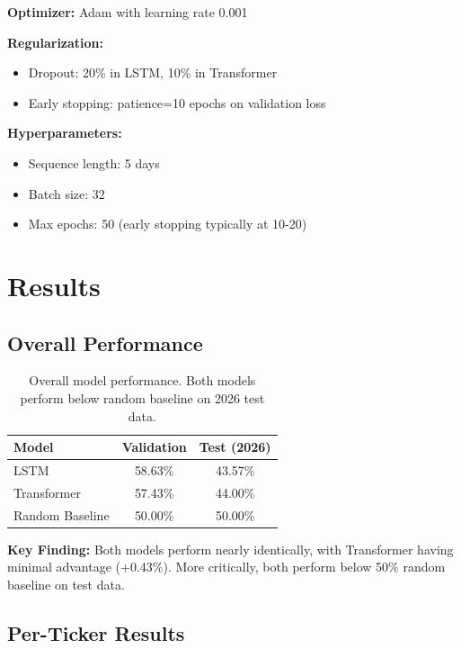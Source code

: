 \documentclass[10pt,twocolumn]{article}
\begin{document}
\textbf{Optimizer:} Adam with learning rate 0.001

\textbf{Regularization:}
\begin{itemize}
\item Dropout: 20\% in LSTM, 10\% in Transformer
\item Early stopping: patience=10 epochs on validation loss
\end{itemize}

\textbf{Hyperparameters:}
\begin{itemize}
\item Sequence length: 5 days
\item Batch size: 32
\item Max epochs: 50 (early stopping typically at 10-20)
\end{itemize}

\section{Results}

\subsection{Overall Performance}

\begin{table}[h]
\centering
\small
\begin{tabular}{lcc}
\toprule
Model & Validation & Test (2026) \\
\midrule
LSTM & 58.63\% & 43.57\% \\
Transformer & 57.43\% & 44.00\% \\
\midrule
Random Baseline & 50.00\% & 50.00\% \\
\bottomrule
\end{tabular}
\caption{Overall model performance. Both models perform below random baseline on 2026 test data.}
\end{table}

\textbf{Key Finding:} Both models perform nearly identically, with Transformer having minimal advantage (+0.43\%). More critically, both perform below 50\% random baseline on test data.

\subsection{Per-Ticker Results}
\end{document}
